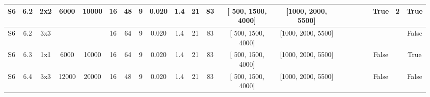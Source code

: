 \begin{table}[!ht]
\begin{tabular}{|c|c|c|c|c|c|c|c|c|c|c|c|c|c|c|c|c|c|c|c|}
        S6 & 6.2 & 2x2 & 6000 & 10000 & 16 & 48 & 9 & 0.020 & 1.4 & 21 & 83 & [ 500, 1500, 4000] & [1000, 2000, 5500] & ~ & ~ & ~ & True & 2 & True \\ \hline
        S6 & 6.2 & 3x3 & ~ & ~ & 16 & 64 & 9 & 0.020 & 1.4 & 21 & 83 & [ 500, 1500, 4000] & [1000, 2000, 5500] & ~ & ~ & ~ & ~ & ~ & False \\ \hline
        S6 & 6.3 & 1x1 & 6000 & 10000 & 16 & 64 & 9 & 0.020 & 1.4 & 21 & 83 & [ 500, 1500, 4000] & [1000, 2000, 5500] & ~ & ~ & ~ & False & ~ & True \\ \hline
        S6 & 6.4 & 3x3 & 12000 & 20000 & 16 & 48 & 9 & 0.020 & 1.4 & 21 & 83 & [ 500, 1500, 4000] & [1000, 2000, 5500] & ~ & ~ & ~ & False & ~ & False \\ \hline
    \end{tabular}
\end{table}